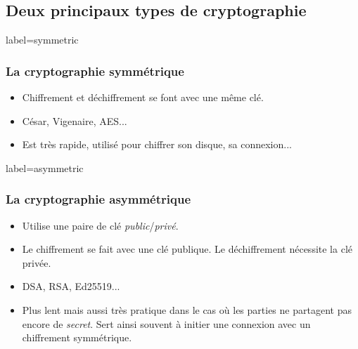 \documentclass{beamer}
\begin{document}
    \subsection{Deux principaux types de cryptographie}
        \begin{frame}{label=symmetric}
            \frametitle{La cryptographie symmétrique}
            \begin{center}
                \begin{itemize}
                    \item Chiffrement et déchiffrement se font avec une même clé.
                    \item César, Vigenaire, AES...
                    \item Est très rapide, utilisé pour chiffrer son disque, sa connexion...
                \end{itemize}
            \end{center}
        \end{frame}
        \begin{frame}{label=asymmetric}
            \frametitle{La cryptographie asymmétrique}
            \begin{center}
                \begin{itemize}
                    \item Utilise une paire de clé \textit{public}/\textit{privé}.
                    \item Le chiffrement se fait avec une clé publique. Le déchiffrement nécessite la clé privée.
                    \item DSA, RSA, Ed25519...
                    \item Plus lent mais aussi très pratique dans le cas où les parties ne partagent pas encore de \textit{secret}. Sert ainsi souvent à initier une connexion avec un chiffrement symmétrique.
                \end{itemize}
            \end{center}
        \end{frame}
\end{document}
